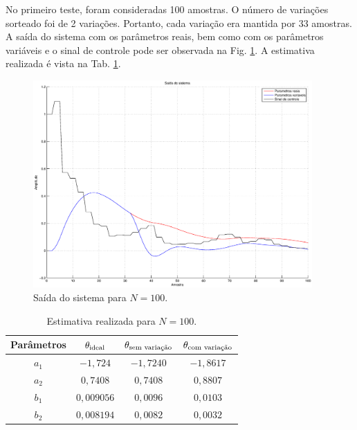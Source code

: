 No primeiro teste, foram consideradas 100 amostras. O número de variações
sorteado foi de 2 variações. Portanto, cada variação era mantida por 33
amostras. A saída do sistema com os parâmetros reais, bem como com os parâmetros
variáveis e o sinal de controle pode ser observada na Fig.
\ref{fig:saida_sist_100}. A estimativa realizada é vista na Tab.
\ref{tab:estimativa_100}.

\begin{figure}[htb]
\centering
    \includegraphics[width=0.95\textwidth]{imgs/questao2/saida_100}
    \caption{Saída do sistema para $N = 100$.}
    \label{fig:saida_sist_100}
\end{figure}

\begin{table}
\centering
    \caption{Estimativa realizada para $N = 100$.}
    \label{tab:estimativa_100}
    \vspace{0.25cm}
    \begin{tabular}{|c|c|c|c|}
        \hline
        Parâmetros & 
        $\mathbf{\theta}_{\text{ideal}}$&
        $\mathbf{\theta}_{\text{sem variação}}$&
        $\mathbf{\theta}_{\text{com variação}}$\\
        \hline
        \hline
        $a_1$ & $-1,724$   & $-1,7240$ & $-1,8617$ \\
        \hline
        $a_2$ & $0,7408$   & $0,7408$  & $0,8807$ \\
        \hline
        $b_1$ & $0,009056$ & $0,0096$  & $0,0103$ \\
        \hline
        $b_2$ & $0,008194$ & $0,0082$  & $0,0032$ \\
        \hline
    \end{tabular}
\end{table}

